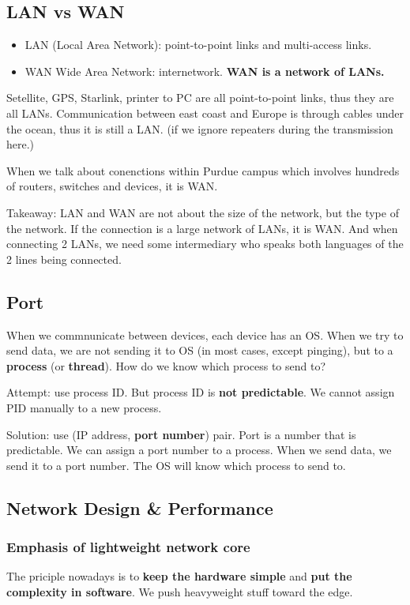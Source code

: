 \documentclass{../../ainote}
\begin{document}
\subsection{LAN vs WAN}

\begin{itemize}[leftmargin=*]
    \item LAN (Local Area Network): point-to-point links and multi-access links.
    \item WAN Wide Area Network: internetwork. \textbf{WAN is a network of LANs.}
\end{itemize}

Setellite, GPS, Starlink, printer to PC are all point-to-point links, thus they are all LANs. Communication between east coast and Europe is through cables under the ocean, thus it is still a LAN. (if we ignore repeaters during the transmission here.) 

When we talk about conenctions within Purdue campus which involves hundreds of routers, switches and devices, it is WAN.

Takeaway: LAN and WAN are not about the size of the network, but the type of the network. If the connection is a large network of LANs, it is WAN. And when connecting 2 LANs, we need some intermediary who speaks both languages of the 2 lines being connected.

\subsection{Port}
When we commnunicate between devices, each device has an OS. When we try to send data, we are not sending it to OS (in most cases, except pinging), but to a \textbf{process} (or \textbf{thread}). How do we know which process to send to? 

Attempt: use process ID. But process ID is \textbf{not predictable}. We cannot assign PID manually to a new process.

Solution: use (IP address, \textbf{port number}) pair. Port is a number that is predictable. We can assign a port number to a process. When we send data, we send it to a port number. The OS will know which process to send to.

\subsection{Network Design \& Performance}

\subsubsection{Emphasis of lightweight network core}
The priciple nowadays is to \textbf{keep the hardware simple} and \textbf{put the complexity in software}. We push heavyweight stuff toward the edge.
\end{document}
